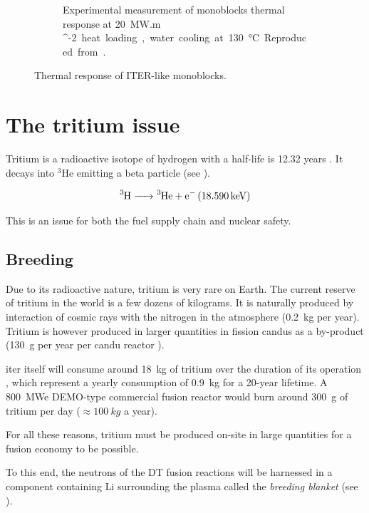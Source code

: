 \begin{figure} [h]
\begin{subfigure}[t]{0.45\linewidth}
            \caption{Experimental measurement of monoblocks thermal response at \SI{20}{MW.m ^{-2}} heat loading, water cooling at \SI{130}{\celsius}. Reproduced from \cite{visca_manufacturing_2018}.}
    \end{subfigure}
    \caption{Thermal response of ITER-like monoblocks.}
\end{figure}

\section{The tritium issue} 

Tritium is a radioactive \gls{isotope} of hydrogen with a half-life is 12.32 years .
It decays into $^3$He emitting a beta particle (see ).

\begin{equation}
    \ce{^3H -> ^3He + e^- (\SI{18.590}{keV})}
    \labeq{tritium decay}
\end{equation}

This is an issue for both the fuel supply chain and nuclear safety.

\subsection{Breeding}
Due to its radioactive nature, tritium is very rare on Earth.
The current reserve of tritium in the world is a few dozens of kilograms.
It is naturally produced by interaction of cosmic rays with the nitrogen in the atmosphere (\SI{0.2}{kg} per year).
Tritium is however produced in larger quantities in fission \glspl{candu} as a by-product (\SI{130}{g} per year per \gls{candu} reactor ).

\acrshort{iter} itself will consume around \SI{18}{kg} of tritium over the duration of its operation , which represent a yearly consumption of \SI{0.9}{kg} for a 20-year lifetime.
A \SI{800}{MWe} DEMO-type commercial fusion reactor would burn around \SI{300}{g} of tritium per day ($\approx \SI{100}{kg}$ a year).

For all these reasons, tritium must be produced on-site in large quantities for a fusion economy to be possible.

To this end, the neutrons of the DT fusion reactions will be harnessed in a component containing \gls{Li} surrounding the \gls{plasma} called the \emph{\gls{breeding blanket}} (see ).


